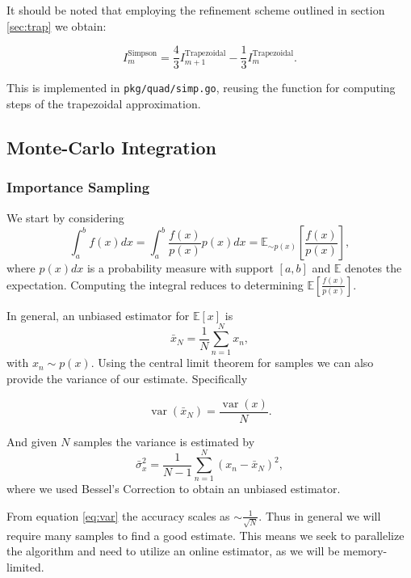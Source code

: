 \documentclass[10pt, a4paper]{article}
\begin{document}
  It should be noted that employing the refinement scheme outlined in section \ref{sec:trap} we
  obtain\cite{nr}:

  \begin{equation}
  I_m^{\text{Simpson}} = \frac{4}{3} I_{m+1}^{\text{Trapezoidal}} - \frac{1}{3} I_m^{\text{Trapezoidal}}.
  \end{equation}

  This is implemented in \texttt{pkg/quad/simp.go}, reusing the function for computing steps of the
  trapezoidal approximation.

\subsection{Monte-Carlo Integration}
  \subsubsection{Importance Sampling}
  \label{sec:mon-is}

  We start by considering
  \begin{equation}
  \int_a^b f(x) dx = \int_{a}^{b} \frac{f(x)}{p(x)} p(x) dx = \mathbb{E}_{\sim p(x)}\left[ \frac{f(x)}{p(x)} \right],
  \end{equation}
  where $p(x)dx$ is a probability measure with support $[a, b]$ and $\mathbb{E}$ denotes the expectation.
  Computing the integral reduces to determining $\mathbb{E}\left[ \frac{f(x)}{p(x)} \right]$.

  In general, an unbiased estimator for $\mathbb{E}\left[ x \right]$ is
  \begin{equation}
  \bar{x}_N = \frac{1}{N} \sum_{n=1}^N x_n,
  \end{equation}
  with $x_n \sim p(x)$. Using the central limit theorem for \iid{} samples we can also provide the
  variance of our estimate. Specifically

  \begin{equation}
  \label{eq:var}
  \operatorname{var}(\bar{x}_N) = \frac{\operatorname{var}(x)}{N}.
  \end{equation}

  And given $N$ \iid{} samples the variance is estimated by
  \begin{equation}
  \bar{\sigma}_x^2 = \frac{1}{N-1} \sum_{n=1}^N (x_n - \bar{x}_N)^2,
  \end{equation}
  where we used Bessel's Correction\cite{nr} to obtain an unbiased estimator.

  From equation \ref{eq:var} the accuracy scales as $\sim \frac{1}{\sqrt{N}}$. Thus in general we will
  require many samples to find a good estimate. This means we seek to parallelize the algorithm and need
  to utilize an online estimator, as we will be memory-limited\footnotemark.
\end{document}
